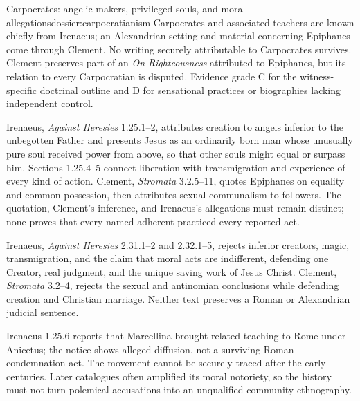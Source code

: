 \begin{heresydossier}{Carpocrates: angelic makers, privileged souls, and moral allegations}{dossier:carpocratianism}
\objectfield Carpocrates and associated teachers are known chiefly from Irenaeus; an Alexandrian setting and material concerning Epiphanes come through Clement. No writing securely attributable to Carpocrates survives. Clement preserves part of an \emph{On Righteousness} attributed to Epiphanes, but its relation to every Carpocratian is disputed. Evidence grade C for the witness-specific doctrinal outline and D for sensational practices or biographies lacking independent control.

\propositionfield Irenaeus, \emph{Against Heresies} 1.25.1--2, attributes creation to angels inferior to the unbegotten Father and presents Jesus as an ordinarily born man whose unusually pure soul received power from above, so that other souls might equal or surpass him. Sections 1.25.4--5 connect liberation with transmigration and experience of every kind of action. Clement, \emph{Stromata} 3.2.5--11, quotes Epiphanes on equality and common possession, then attributes sexual communalism to followers. The quotation, Clement's inference, and Irenaeus's allegations must remain distinct; none proves that every named adherent practiced every reported act.

\responsefield Irenaeus, \emph{Against Heresies} 2.31.1--2 and 2.32.1--5, rejects inferior creators, magic, transmigration, and the claim that moral acts are indifferent, defending one Creator, real judgment, and the unique saving work of Jesus Christ. Clement, \emph{Stromata} 3.2--4, rejects the sexual and antinomian conclusions while defending creation and Christian marriage. Neither text preserves a Roman or Alexandrian judicial sentence.

\aftermathfield Irenaeus 1.25.6 reports that Marcellina brought related teaching to Rome under Anicetus; the notice shows alleged diffusion, not a surviving Roman condemnation act. The movement cannot be securely traced after the early centuries. Later catalogues often amplified its moral notoriety, so the history must not turn polemical accusations into an unqualified community ethnography.
\end{heresydossier}

